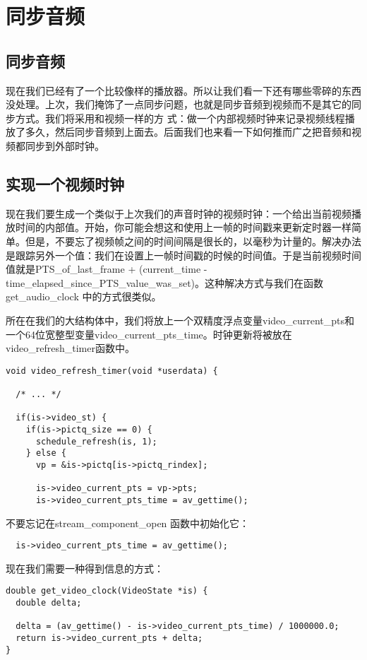 ﻿\chapter{同步音频}
\label{ch6}
\section{同步音频}
现在我们已经有了一个比较像样的播放器。所以让我们看一下还有哪些零碎的东西没处理。上次，我们掩饰了一点同步问题，也就是同步音频到视频而不是其它的同步方式。我们将采用和视频一样的方 式：做一个内部视频时钟来记录视频线程播放了多久，然后同步音频到上面去。后面我们也来看一下如何推而广之把音频和视频都同步到外部时钟。
\section{实现一个视频时钟}
现在我们要生成一个类似于上次我们的声音时钟的视频时钟：一个给出当前视频播放时间的内部值。开始，你可能会想这和使用上一帧的时间戳来更新定时器一样简单。但是，不要忘了视频帧之间的时间间隔是很长的，以毫秒为计量的。解决办法是跟踪另外一个值：我们在设置上一帧时间戳的时候的时间值。于是当前视频时间值就是PTS_of_last_frame + (current_time -time_elapsed_since_PTS_value_was_set)。这种解决方式与我们在函数get_audio_clock 中的方式很类似。

所在在我们的大结构体中，我们将放上一个双精度浮点变量video_current_pts和一个64位宽整型变量video_current_pts_time。时钟更新将被放在video_refresh_timer函数中。

\begin{lstlisting}
void video_refresh_timer(void *userdata) {

  /* ... */

  if(is->video_st) {
    if(is->pictq_size == 0) {
      schedule_refresh(is, 1);
    } else {
      vp = &is->pictq[is->pictq_rindex];

      is->video_current_pts = vp->pts;
      is->video_current_pts_time = av_gettime();
\end{lstlisting}
不要忘记在stream_component_open 函数中初始化它：
\begin{lstlisting}
  is->video_current_pts_time = av_gettime();
\end{lstlisting}
现在我们需要一种得到信息的方式：
\begin{lstlisting}
double get_video_clock(VideoState *is) {
  double delta;

  delta = (av_gettime() - is->video_current_pts_time) / 1000000.0;
  return is->video_current_pts + delta;
}
\end{lstlisting}
